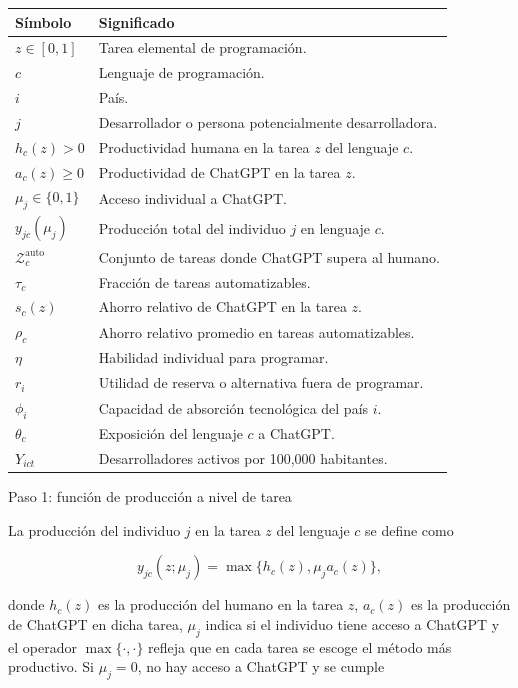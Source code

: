 \documentclass[12pt,a4paper]{article}
\let\textbf\textmd
\newcommand{\Zauto}{\mathcal{Z}^{\mathrm{auto}}_c}
\begin{document}
\begin{center}
\begin{tabular}{ll}
\toprule
Símbolo & Significado \\
\midrule
$z \in [0,1]$ & Tarea elemental de programación. \\
$c$ & Lenguaje de programación. \\
$i$ & País. \\
$j$ & Desarrollador o persona potencialmente desarrolladora. \\
$h_c(z)>0$ & Productividad humana en la tarea $z$ del lenguaje $c$. \\
$a_c(z)\geq 0$ & Productividad de ChatGPT en la tarea $z$. \\
$\mu_j \in \{0,1\}$ & Acceso individual a ChatGPT. \\
$y_{jc}(\mu_j)$ & Producción total del individuo $j$ en lenguaje $c$. \\
$\Zauto$ & Conjunto de tareas donde ChatGPT supera al humano. \\
$\tau_c$ & Fracción de tareas automatizables. \\
$s_c(z)$ & Ahorro relativo de ChatGPT en la tarea $z$. \\
$\rho_c$ & Ahorro relativo promedio en tareas automatizables. \\
$\eta$ & Habilidad individual para programar. \\
$r_i$ & Utilidad de reserva o alternativa fuera de programar. \\
$\phi_i$ & Capacidad de absorción tecnológica del país $i$. \\
$\theta_c$ & Exposición del lenguaje $c$ a ChatGPT. \\
$Y_{ict}$ & Desarrolladores activos por 100,000 habitantes. \\
\bottomrule
\end{tabular}
\end{center}

\bigskip
\noindent\textbf{Paso 1: función de producción a nivel de tarea}

\medskip
\noindent La producción del individuo $j$ en la tarea $z$ del lenguaje $c$ se define como

\[
y_{jc}(z;\mu_j)=\max\{h_c(z),\mu_j a_c(z)\},
\]

donde $h_c(z)$ es la producción del humano en la tarea $z$, $a_c(z)$ es la producción de ChatGPT en dicha tarea, $\mu_j$ indica si el individuo tiene acceso a ChatGPT y el operador $\max\{\cdot,\cdot\}$ refleja que en cada tarea se escoge el método más productivo. Si $\mu_j=0$, no hay acceso a ChatGPT y se cumple
\end{document}
